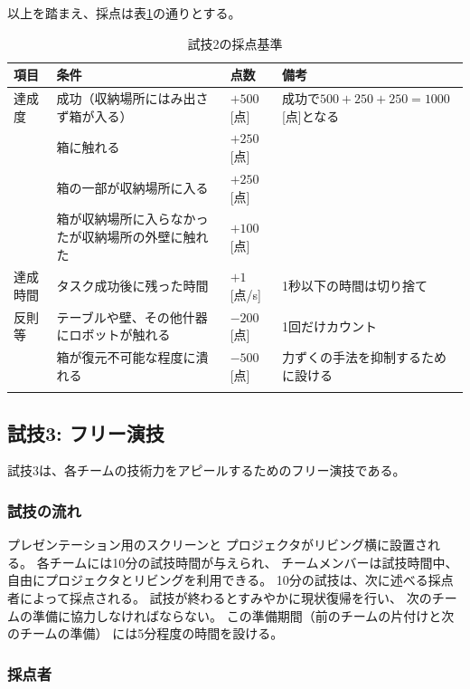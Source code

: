 \documentclass[a4j]{jarticle}
\def\thline{\noalign{\hrule height 1pt}}
\begin{document}
以上を踏まえ、採点は表\ref{table:test2score}の通りとする。

\begin{table}
\begin{center}
\caption{試技2の採点基準}
\label{table:test2score}
\begin{tabular}{l|p{5cm}|l|p{5cm}}
\thline
項目 & 条件 & 点数 & 備考\\
\hline
達成度 & 成功（収納場所にはみ出さず箱が入る） & $+500$[点] & 成功で$500 + 250 + 250 = 1000$[点]となる \\
& 箱に触れる & $+250$[点] & \\
 & 箱の一部が収納場所に入る & $+250$[点] & \\
 & 箱が収納場所に入らなかったが収納場所の外壁に触れた & $+100$[点] & \\
\hline
達成時間 & タスク成功後に残った時間 & $+1$[点/s] & 1秒以下の時間は切り捨て\\
\hline
反則等 & テーブルや壁、その他什器にロボットが触れる & $-200$[点] & 1回だけカウント\\
	& 箱が復元不可能な程度に潰れる & $-500$[点] & 力ずくの手法を抑制するために設ける \\
\thline
\end{tabular}
\end{center}
\end{table}


\subsection{試技3: フリー演技}

試技3は、各チームの技術力をアピールするためのフリー演技である。

\subsubsection{試技の流れ}

プレゼンテーション用のスクリーンと
プロジェクタがリビング横に設置される。
各チームには10分の試技時間が与えられ、
チームメンバーは試技時間中、
自由にプロジェクタとリビングを利用できる。
10分の試技は、次に述べる採点者によって採点される。
試技が終わるとすみやかに現状復帰を行い、
次のチームの準備に協力しなければならない。
この準備期間（前のチームの片付けと次のチームの準備）
には5分程度の時間を設ける。

\subsubsection{採点者}
\end{document}
